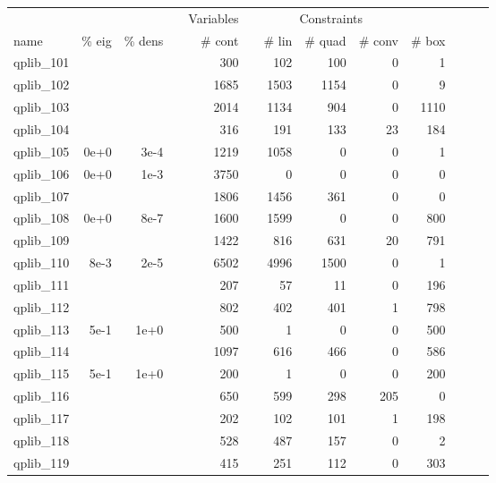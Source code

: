 \begin{table}
 \centering
 \setlength{\tabcolsep}{11pt}
 \renewcommand \arraystretch{1}
\begin{tabular}{lrrrrrrrrrrrr}
\toprule

		&		&		&	&	\multicolumn{1}{c}{Variables}	&	&	\multicolumn{3}{c}{Constraints}							\\
\cmidrule(lr){5-5} \cmidrule(lr){7-10}																	
name	&	\% eig	&	\% dens	&	&	\# cont 	&	&	\# lin 	&	\# quad 	&	\# conv 	&	\# box	\\
\cmidrule(lr){5-5} \cmidrule(lr){7-10}																	


		qplib\_101	&		&		&	&	300	&	&	102	&	100	&	0	&	1	\\
qplib\_102	&		&		&	&	1685	&	&	1503	&	1154	&	0	&	9	\\
qplib\_103	&		&		&	&	2014	&	&	1134	&	904	&	0	&	1110	\\
qplib\_104	&		&		&	&	316	&	&	191	&	133	&	23	&	184	\\
qplib\_105	&	0e+0	&	3e-4	&	&	1219	&	&	1058	&	0	&	0	&	1	\\
qplib\_106	&	0e+0	&	1e-3	&	&	3750	&	&	0	&	0	&	0	&	0	\\
qplib\_107	&		&		&	&	1806	&	&	1456	&	361	&	0	&	0	\\
qplib\_108	&	0e+0	&	8e-7	&	&	1600	&	&	1599	&	0	&	0	&	800	\\
qplib\_109	&		&		&	&	1422	&	&	816	&	631	&	20	&	791	\\
qplib\_110	&	8e-3	&	2e-5	&	&	6502	&	&	4996	&	1500	&	0	&	1	\\
qplib\_111	&		&		&	&	207	&	&	57	&	11	&	0	&	196	\\
qplib\_112	&		&		&	&	802	&	&	402	&	401	&	1	&	798	\\
qplib\_113	&	5e-1	&	1e+0	&	&	500	&	&	1	&	0	&	0	&	500	\\
qplib\_114	&		&		&	&	1097	&	&	616	&	466	&	0	&	586	\\
qplib\_115	&	5e-1	&	1e+0	&	&	200	&	&	1	&	0	&	0	&	200	\\
qplib\_116	&		&		&	&	650	&	&	599	&	298	&	205	&	0	\\
qplib\_117	&		&		&	&	202	&	&	102	&	101	&	1	&	198	\\
qplib\_118	&		&		&	&	528	&	&	487	&	157	&	0	&	2	\\
qplib\_119	&		&		&	&	415	&	&	251	&	112	&	0	&	303	\\

\end{tabular}
\end{table}
